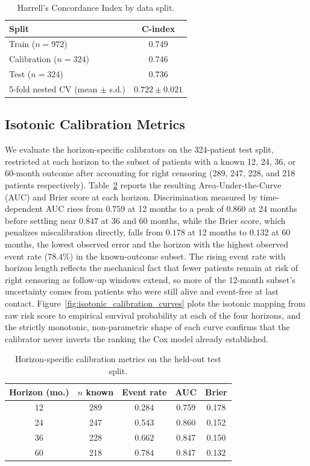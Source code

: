 \documentclass[sigconf, review=true]{acmart}
\begin{document}
\begin{table}[t]
  \caption{Harrell's Concordance Index by data split.}
  \label{tab:cindex}
  \begin{tabular}{lc}
    \toprule
    Split & C-index \\
    \midrule
    Train ($n=972$) & 0.749 \\
    Calibration ($n=324$) & 0.746 \\
    Test ($n=324$) & 0.736 \\
    5-fold nested CV (mean $\pm$ s.d.) & $0.722 \pm 0.021$ \\
  \bottomrule
\end{tabular}
\end{table}

\subsection{Isotonic Calibration Metrics}
We evaluate the horizon-specific calibrators on the 324-patient test split, restricted at each horizon to the subset of patients with a known 12, 24, 36, or 60-month outcome after accounting for right censoring (289, 247, 228, and 218 patients respectively). Table~\ref{tab:horizon_metrics} reports the resulting Area-Under-the-Curve (AUC) and Brier score at each horizon. Discrimination measured by time-dependent AUC rises from $0.759$ at 12 months to a peak of $0.860$ at 24 months before settling near $0.847$ at 36 and 60 months, while the Brier score, which penalizes miscalibration directly, falls from $0.178$ at 12 months to $0.132$ at 60 months, the lowest observed error and the horizon with the highest observed event rate ($78.4\%$) in the known-outcome subset. The rising event rate with horizon length reflects the mechanical fact that fewer patients remain at risk of right censoring as follow-up windows extend, so more of the 12-month subset's uncertainty comes from patients who were still alive and event-free at last contact. Figure~\ref{fig:isotonic_calibration_curves} plots the isotonic mapping from raw risk score to empirical survival probability at each of the four horizons, and the strictly monotonic, non-parametric shape of each curve confirms that the calibrator never inverts the ranking the Cox model already established.

\begin{table}[t]
  \caption{Horizon-specific calibration metrics on the held-out test split.}
  \label{tab:horizon_metrics}
  \begin{tabular}{ccccc}
    \toprule
    Horizon (mo.) & $n$ known & Event rate & AUC & Brier \\
    \midrule
    12 & 289 & 0.284 & 0.759 & 0.178 \\
    24 & 247 & 0.543 & 0.860 & 0.152 \\
    36 & 228 & 0.662 & 0.847 & 0.150 \\
    60 & 218 & 0.784 & 0.847 & 0.132 \\
  \bottomrule
\end{tabular}
\end{table}
\end{document}
